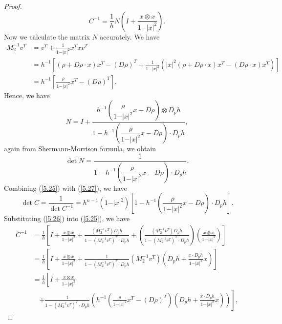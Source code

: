\documentclass[a4paper,12pt,]{article}
\numberwithin{equation}{section}
\numberwithin{equation}{section} \allowdisplaybreaks
\begin{document}
\begin{proof}
\begin{equation}
    C^{-1} = \frac{1}{h}N\left(I + \frac{x \otimes x}{1 - \vert x \vert^{2}}\right).
  \end{equation}
  Now we calculate the matrix $N$ accurately. We have
  \begin{align*}
    M_{2}^{-1}v^{T} & = v^{T} + \frac{1}{1 - \vert x \vert^{2}} x^{T}xv^{T} \\
      & = h^{-1}\left[(\rho + D\rho \cdot x)x^{T} - (D\rho)^{T} + \frac{1}{1 - \vert x \vert^{2}}(\vert x \vert^{2}(\rho + D\rho \cdot x)x^{T} - (D\rho \cdot x)x^{T})\right] \\
      & = h^{-1}\left[\frac{\rho}{1 - \vert x \vert^{2}}x^{T} - (D\rho)^{T}\right].
  \end{align*}
  Hence, we have
  \begin{equation}\label{5.26}
    N = I + \frac{h^{-1}\left(\dfrac{\rho}{1 - \vert x \vert^{2}}x - D\rho\right)\otimes D_{p}h}{1 - h^{-1}\left(\dfrac{\rho}{1 - \vert x \vert^{2}}x - D\rho\right)\cdot D_{p}h},
  \end{equation}
  again from Shermann-Morrison formula, we obtain
    \begin{equation}\label{5.27}
    \det N = \frac{1}{1 - h^{-1}\left(\dfrac{\rho}{1 - \vert x \vert^{2}}x - D\rho\right)\cdot D_{p}h}.
  \end{equation}
  Combining (\ref{5.25}) with (\ref{5.27}), we have
    \begin{equation}\label{5.28}
    \det C = \frac{1}{\det C^{-1}} = h^{n-1}(1 - \vert x \vert^{2})\left[1 - h^{-1}\left(\frac{\rho}{1 - \vert x \vert^{2}}x - D\rho\right)\cdot D_{p}h\right].
  \end{equation}
  Substituting (\ref{5.26}) into (\ref{5.25}), we have
    \begin{align*}
    C^{-1} & = \frac{1}{h}\left[I + \frac{x\otimes x}{1 - \vert x \vert^{2}} + \frac{(M_{2}^{-1}v^{T})D_{p}h}{1 - (M_{2}^{-1}v^{T})^{T}\cdot D_{p}h} + \left(\frac{(M_{2}^{-1}v^{T})D_{p}h}{1 - (M_{2}^{-1}v^{T})^{T}\cdot D_{p}h}\right)\left(\frac{x \otimes x}{1 - \vert x \vert^{2}}\right)\right] \\
      & = \frac{1}{h}\left[I + \frac{x\otimes x}{1 - \vert x \vert^{2}} + \frac{1}{1 - (M_{2}^{-1}v^{T})^{T}\cdot D_{p}h}(M_{2}^{-1}v^{T})\left(D_{p}h + \frac{x \cdot D_{p}h}{1 - \vert x \vert^{2}}x\right)\right] \\
      & = \frac{1}{h}\left[I + \frac{x\otimes x}{1 - \vert x \vert^{2}}\right.  \\
      & \quad \left. + \frac{1}{1 - (M_{2}^{-1}v^{T})^{T}\cdot D_{p}h}\left(h^{-1}\left(\frac{\rho}{1 - \vert x \vert^{2}}x^{T} - (D\rho)^{T}\right)\left(D_{p}h + \frac{x \cdot D_{p}h}{1 - \vert x \vert^{2}}x\right)\right)\right],

\end{align*}
\end{proof}
\end{document}
